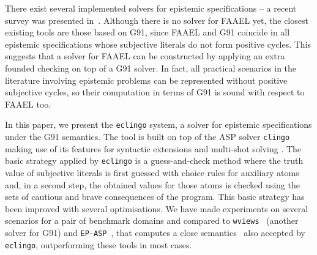 \documentclass{new_tlp}
\def\eclingo{{\tt eclingo}}
\def\clingo{{\tt clingo}}
\def\wviews{{\tt wviews}}
\def\EPASP{{\tt EP-ASP}}
\begin{document}
There exist several implemented solvers for epistemic specifications -- a recent survey was presented in~\cite{leckah18}.
%
Although there is no solver for FAAEL yet, the closest existing tools are those based on G91, since FAAEL and G91 coincide in all epistemic specifications whose subjective literals do not form positive cycles.
%
This suggests that a solver for FAAEL can be constructed by applying an extra founded checking on top of a G91 solver.
%
In fact, all practical scenarios in the literature involving epistemic problems can be represented without positive subjective cycles, so their computation in terms of G91 is sound with respect to FAAEL too.

In this paper, we present the \eclingo{} system, a solver for epistemic specifications under the G91 semantics.
%
The tool is built on top of the ASP solver \clingo~\cite{gekakaosscwa16a}
making use of its features for syntactic extensions and multi-shot solving \cite{gekakasc17a}.
%
The basic strategy applied by \eclingo{} is a guess-and-check method where the truth value of subjective literals is first guessed with choice rules for auxiliary atoms and, in a second step, the obtained values for those atoms is checked using the sets of cautious and brave consequences of the program.
%
This basic strategy has been improved with several optimisations.
%
We have made experiments on several scenarios for a pair of benchmark domains and compared to \wviews~\cite{Kelly07} (another solver for G91) and {\tt \EPASP}~\cite{SLKL17}, that computes a close semantics~\cite{kawabagezh15} also accepted by \eclingo{}, outperforming these tools in most cases.




\end{document}
